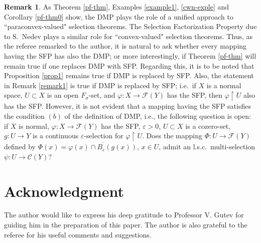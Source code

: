 \documentclass[12pt,a4paper,fleqn,leqno]{amsart}
\theoremstyle{plain}
\theoremstyle{definition}
\newtheorem{remark}[theorem]{Remark}
\numberwithin{equation}{section}
\begin{document}
\begin{remark}

As Theorem \ref{pf-thm}, Examples \ref{example1}, \ref{cwn-exple} and Corollary  \ref{pf-thm0} show, the DMP plays the role of a unified approach to ``paraconvex-valued" selection theorems. The Selection Factorization Property due to S.\ Nedev \cite{nedev} plays a similar role for ``convex-valued" selection theorems. Thus, as the referee remarked to the author, it is natural to ask whether every mapping having the SFP has also the DMP; or more interestingly, if Theorem \ref{pf-thm} will remain true if one replaces DMP with SFP. Regarding this, it is to be noted that Proposition \ref{prop1} remains true if DMP is replaced by SFP. Also, the statement in Remark \ref{remark1} is true if DMP is replaced by SFP; i.e.\ if $X$ is a normal space, $U\subset X$ is an open $F_{\sigma}$-set, and $\varphi:X\to\mathscr{F}(Y)$ has the SFP, then $\varphi\operatorname{\upharpoonright} U$ also has the SFP. However, it is not evident that a mapping having the SFP satisfies the condition $(b)$ of the definition of DMP, i.e., the following question is open: if $X$ is normal, $\varphi:X\to\mathscr{F}(Y)$ has the SFP, $\varepsilon>0$, $U\subset X$ is a cozero-set, $g:U\to Y$ is a continuous $\varepsilon$-selection for $\varphi\operatorname{\upharpoonright} U$. Does the mapping $\Phi:U\to\mathscr{F}(Y)$ defined by $\Phi(x)= \overline{\varphi(x)\cap B_{\varepsilon}(g(x))}$, $x\in U$, admit an l.s.c.\ multi-selection $\psi:U\to \mathscr{C}(Y)$?
\end{remark}

\section{Acknowledgment}

The author would like to express his deep gratitude to Professor V. Gutev for guiding him
in the preparation of this paper. The author is also grateful to the referee for his useful comments and suggestions.
\vspace{1cm}
\end{document}
